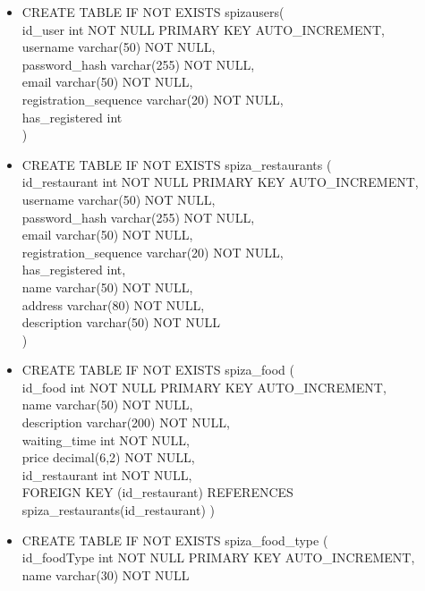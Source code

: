 \documentclass[12pt]{scrartcl}
\begin{document}
\begin{itemize}
 
    \item[] CREATE TABLE IF NOT EXISTS spiza\textunderscore users( \\
    id\_user int NOT NULL PRIMARY KEY AUTO\_INCREMENT,\\
    username varchar(50) NOT NULL,\\
    password\_hash varchar(255) NOT NULL,\\
    email varchar(50) NOT NULL,\\
    registration\_sequence varchar(20) NOT NULL,
    \\has\_registered int\\
    )
    \item[] CREATE TABLE IF NOT EXISTS spiza\_restaurants (\\
    id\_restaurant int NOT NULL PRIMARY KEY AUTO\_INCREMENT,\\
    username varchar(50) NOT NULL, \\
    password\_hash varchar(255) NOT NULL,\\
    email varchar(50) NOT NULL,\\
    registration\_sequence varchar(20) NOT NULL,\\
    has\_registered int,\\
    name varchar(50) NOT NULL,\\
    address varchar(80) NOT NULL,\\
    description varchar(50) NOT NULL\\
    )
    \item[] CREATE TABLE IF NOT EXISTS spiza\_food (\\
    id\_food int NOT NULL PRIMARY KEY AUTO\_INCREMENT,\\
    name varchar(50) NOT NULL,\\
    description varchar(200) NOT NULL,\\
    waiting\_time int NOT NULL,\\
    price decimal(6,2) NOT NULL,\\
    id\_restaurant int NOT NULL,\\
    FOREIGN KEY (id\_restaurant) REFERENCES spiza\_restaurants(id\_restaurant)
    )
    \item[] CREATE TABLE IF NOT EXISTS spiza\_food\_type (\\
    id\_foodType int NOT NULL PRIMARY KEY AUTO\_INCREMENT,\\
    name varchar(30) NOT NULL\\

\end{itemize}
\end{document}
